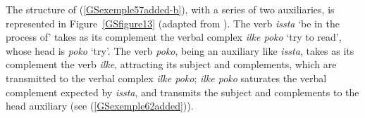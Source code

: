 {The structure of (\ref{GSexemple57added-b}), with a series of two auxiliaries, is represented in Figure~\ref{GSfigure13} (adapted from \citealt[171]{Chung98a-u}). The verb \emph{issta} `be in the process of' takes as its complement the verbal complex \emph{ilke poko} `try to read', whose head is \emph{poko} `try'. The verb \emph{poko}, being an auxiliary like \emph{issta}, takes as its complement the verb \emph{ilke}, attracting its subject and complements, which are transmitted to the verbal complex \emph{ilke poko}; \emph{ilke poko} saturates the verbal complement expected by \emph{issta}, and transmits the subject and complements to the head auxiliary (see (\ref{GSexemple62added})).

		


}
